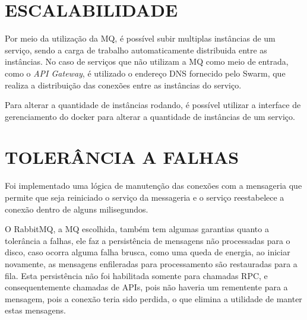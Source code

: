 \section{ESCALABILIDADE}

Por meio da utilização da \ac{MQ}, é possível subir multiplas instâncias de um serviço,
sendo a carga de trabalho automaticamente distribuida entre as instâncias. No caso de
serviços que não utilizam a \ac{MQ} como meio de entrada, como o \emph{API Gateway},
é utilizado o endereço \ac{DNS} fornecido pelo Swarm, que realiza a distribuição das
conexões entre as instâncias do serviço.

Para alterar a quantidade de instâncias rodando, é possível utilizar a interface de
gerenciamento do docker para alterar a quantidade de instâncias de um serviço.

\section{TOLERÂNCIA A FALHAS}

Foi implementado uma lógica de manutenção das conexões com a mensageria que permite
que seja reiniciado o serviço da messageria e o serviço reestabelece a conexão dentro
de alguns milisegundos.

O RabbitMQ, a \ac{MQ} escolhida, também tem algumas garantias quanto a tolerância a
falhas, ele faz a persistência de mensagens não processadas para o disco, caso ocorra
alguma falha brusca, como uma queda de energia, ao iniciar novamente, as mensagens
enfileradas para processamento são restauradas para a fila. Esta persistência não foi
habilitada somente para chamadas \ac{RPC}, e consequentemente chamadas de \acp{API},
pois não haveria um rementente para a mensagem, pois a conexão teria sido perdida,
o que elimina a utilidade de manter estas mensagens.

